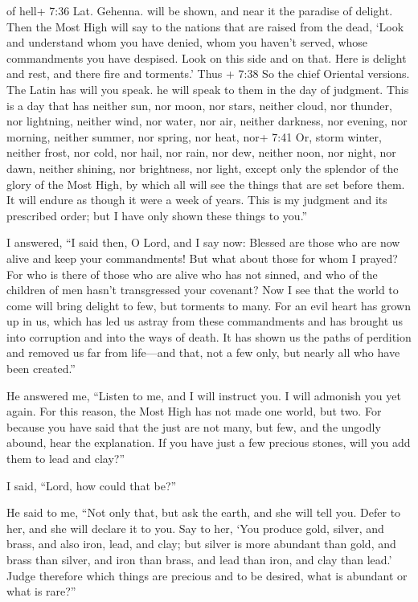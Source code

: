 of hell+ 7:36 Lat. Gehenna. will be shown, and near it the paradise of
delight.  Then the Most High will say to the nations that
are raised from the dead, `Look and understand whom you have denied,
whom you haven't served, whose commandments you have despised.
 Look on this side and on that. Here is delight and rest,
and there fire and torments.' Thus + 7:38 So the chief Oriental
versions. The Latin has will you speak. he will speak to them in the day
of judgment.  This is a day that has neither sun, nor moon,
nor stars,  neither cloud, nor thunder, nor lightning,
neither wind, nor water, nor air, neither darkness, nor evening, nor
morning,  neither summer, nor spring, nor heat, nor+ 7:41
Or, storm winter, neither frost, nor cold, nor hail, nor rain, nor dew,
 neither noon, nor night, nor dawn, neither shining, nor
brightness, nor light, except only the splendor of the glory of the Most
High, by which all will see the things that are set before them.
 It will endure as though it were a week of years.
 This is my judgment and its prescribed order; but I have
only shown these things to you.''

 I answered, ``I said then, O Lord, and I say now: Blessed
are those who are now alive and keep your commandments! 
But what about those for whom I prayed? For who is there of those who
are alive who has not sinned, and who of the children of men hasn't
transgressed your covenant?  Now I see that the world to
come will bring delight to few, but torments to many.  For
an evil heart has grown up in us, which has led us astray from these
commandments and has brought us into corruption and into the ways of
death. It has shown us the paths of perdition and removed us far from
life---and that, not a few only, but nearly all who have been created.''

 He answered me, ``Listen to me, and I will instruct you. I
will admonish you yet again.  For this reason, the Most
High has not made one world, but two.  For because you have
said that the just are not many, but few, and the ungodly abound, hear
the explanation.  If you have just a few precious stones,
will you add them to lead and clay?''

 I said, ``Lord, how could that be?''

 He said to me, ``Not only that, but ask the earth, and she
will tell you. Defer to her, and she will declare it to you.
 Say to her, `You produce gold, silver, and brass, and also
iron, lead, and clay;  but silver is more abundant than
gold, and brass than silver, and iron than brass, and lead than iron,
and clay than lead.'  Judge therefore which things are
precious and to be desired, what is abundant or what is rare?''

